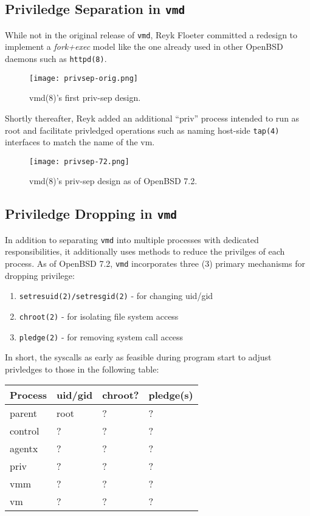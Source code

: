 \documentclass[conference]{IEEEtran}
\begin{document}
\vspace{3mm}
\subsection{Priviledge Separation in \texttt{vmd}}
While not in the original release of \texttt{vmd}, Reyk Floeter
committed \cite{b6} a redesign to implement a \emph{fork+exec} model
like the one already used in other OpenBSD daemons such as
\texttt{httpd(8)}.

\begin{figure}
  \texttt{[image: privsep-orig.png]}
  \caption{vmd(8)'s first priv-sep design.}
\end{figure}

Shortly thereafter, Reyk added \cite{b7} an additional ``priv''
process intended to run as root and facilitate privledged operations
such as naming host-side \texttt{tap(4)} interfaces to match the name
of the vm.

\begin{figure}
  \texttt{[image: privsep-72.png]}
  \caption{vmd(8)'s priv-sep design as of OpenBSD 7.2.}
\end{figure}


\vspace{3mm}
\subsection{Priviledge Dropping in \texttt{vmd}}
In addition to separating \texttt{vmd} into multiple processes with
dedicated responsibilities, it additionally uses methods to reduce the
privilges of each process. As of OpenBSD 7.2, \texttt{vmd}
incorporates three (3) primary mechanisms for dropping privilege:

\vspace{2mm}
\begin{enumerate}
\item \texttt{setresuid(2)/setresgid(2)} - for changing uid/gid
\item \texttt{chroot(2)} - for isolating file system access
\item \texttt{pledge(2)} - for removing system call access
\end{enumerate}
\vspace{2mm}

In short, the syscalls as early as feasible during program start to
adjust privledges to those in the following table:

\begin{center}
\begin{tabular}{| l | l | l | l |}
  \hline
  Process & uid/gid & chroot? & pledge(s) \\ \hline
  parent & root & ? & ? \\ \hline
  control & ? & ? & ? \\ \hline
  agentx & ? & ? & ? \\ \hline
  priv & ? & ? & ? \\ \hline
  vmm & ? & ? & ? \\ \hline
  vm & ? & ? & ? \\
  \hline
\end{tabular}
\end{center}
\end{document}
